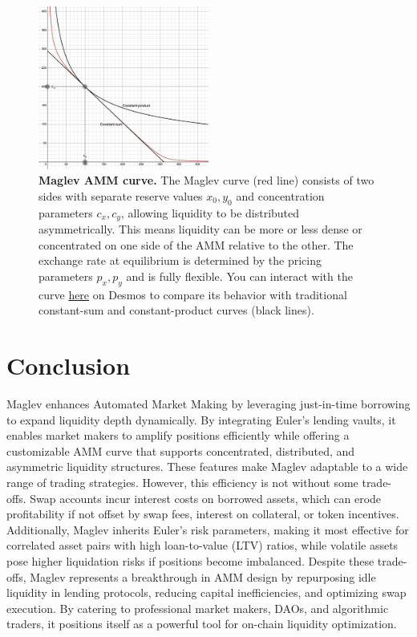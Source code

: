 \documentclass{article}
\begin{document}
 \begin{figure}[h]  %
    \centering  %
    \includegraphics[width=0.5\textwidth]{curve.png} %
    \caption{\textbf{Maglev AMM curve.} The Maglev curve (red line) consists of two sides with separate reserve values $x_0, y_0$ and concentration parameters $c_x, c_y$, allowing liquidity to be distributed asymmetrically. This means liquidity can be more or less dense or concentrated on one side of the AMM relative to the other. The exchange rate at equilibrium is determined by the pricing parameters $p_x, p_y$ and is fully flexible. You can interact with the curve \href{https://www.desmos.com/calculator/gzwmvbs1dk}{here} on Desmos to compare its behavior with traditional constant-sum and constant-product curves (black lines).}
    \label{fig:fig1}  %
\end{figure}

\section{Conclusion}

Maglev enhances Automated Market Making by leveraging just-in-time borrowing to expand liquidity depth dynamically. By integrating Euler’s lending vaults, it enables market makers to amplify positions efficiently while offering a customizable AMM curve that supports concentrated, distributed, and asymmetric liquidity structures. These features make Maglev adaptable to a wide range of trading strategies. However, this efficiency is not without some trade-offs. Swap accounts incur interest costs on borrowed assets, which can erode profitability if not offset by swap fees, interest on collateral, or token incentives. Additionally, Maglev inherits Euler’s risk parameters, making it most effective for correlated asset pairs with high loan-to-value (LTV) ratios, while volatile assets pose higher liquidation risks if positions become imbalanced. Despite these trade-offs, Maglev represents a breakthrough in AMM design by repurposing idle liquidity in lending protocols, reducing capital inefficiencies, and optimizing swap execution. By catering to professional market makers, DAOs, and algorithmic traders, it positions itself as a powerful tool for on-chain liquidity optimization.
\end{document}
